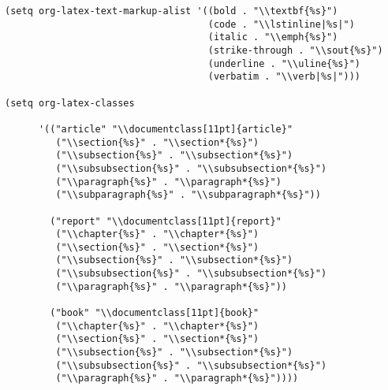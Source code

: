 \documentclass[french]{report}
\begin{document}
\lstset{language=Lisp,label= ,caption= ,captionpos=b,numbers=none}
\begin{lstlisting}
(setq org-latex-text-markup-alist '((bold . "\\textbf{%s}")
                                    (code . "\\lstinline|%s|")
                                    (italic . "\\emph{%s}")
                                    (strike-through . "\\sout{%s}")
                                    (underline . "\\uline{%s}")
                                    (verbatim . "\\verb|%s|")))

(setq org-latex-classes

      '(("article" "\\documentclass[11pt]{article}"
         ("\\section{%s}" . "\\section*{%s}")
         ("\\subsection{%s}" . "\\subsection*{%s}")
         ("\\subsubsection{%s}" . "\\subsubsection*{%s}")
         ("\\paragraph{%s}" . "\\paragraph*{%s}")
         ("\\subparagraph{%s}" . "\\subparagraph*{%s}"))

        ("report" "\\documentclass[11pt]{report}"
         ("\\chapter{%s}" . "\\chapter*{%s}")
         ("\\section{%s}" . "\\section*{%s}")
         ("\\subsection{%s}" . "\\subsection*{%s}")
         ("\\subsubsection{%s}" . "\\subsubsection*{%s}")
         ("\\paragraph{%s}" . "\\paragraph*{%s}"))

        ("book" "\\documentclass[11pt]{book}"
         ("\\chapter{%s}" . "\\chapter*{%s}")
         ("\\section{%s}" . "\\section*{%s}")
         ("\\subsection{%s}" . "\\subsection*{%s}")
         ("\\subsubsection{%s}" . "\\subsubsection*{%s}")
         ("\\paragraph{%s}" . "\\paragraph*{%s}"))))
\end{lstlisting}
\end{document}
